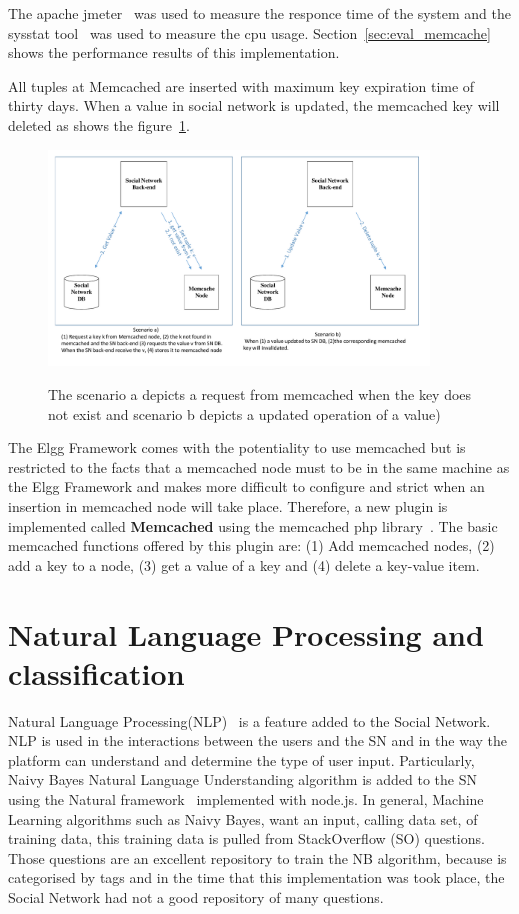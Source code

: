 The apache jmeter~\cite{jmeter_url} was used to measure the responce time of the system and the sysstat tool~\cite{sysstat_url} was used to measure the cpu usage. Section~\ref{sec:eval_memcache} 
 shows the performance results of this implementation.

All tuples at Memcached are inserted with maximum key expiration time of thirty days. When a value in social network is updated, the memcached key will deleted as shows the figure~\ref{fig:memcache_key_value}.

\begin{figure}[h]
	\caption{The scenario a depicts a request from memcached when the key does not exist and scenario b depicts a updated operation of a value) }
	\includegraphics[width=0.9\textwidth]{./fig/memcached_key_value.pdf}
	\centering
	\label{fig:memcache_key_value}
\end{figure}

The Elgg Framework comes with the potentiality to use memcached but is restricted to the facts that a memcached node must to be in the same machine as the Elgg Framework and makes more difficult to configure and strict when an insertion in memcached node will take place. Therefore, a new plugin is implemented called \textbf{Memcached} using the memcached php library~\cite{memcached_php_doc}. The basic memcached functions offered by this plugin are: (1) Add memcached nodes, (2) add a key to a node, (3) get a value of a key and (4) delete a key-value item. 

\section{Natural Language Processing and classification}
\label{sec:natural_implementation}
Natural Language Processing(NLP)~\cite{manning1999foundations} is a feature added to the Social Network. NLP is used in the interactions between the users and the SN and in the way the platform can understand and determine the type of user input. Particularly, Naivy Bayes Natural Language Understanding algorithm is added to the SN using the Natural framework~\cite{nodenatural_url} implemented with node.js. In general, Machine Learning algorithms such as Naivy Bayes, want an input, calling data set, of training data, this training data is pulled from StackOverflow (SO) questions. Those questions are an excellent repository to train the NB algorithm, because is categorised by tags and in the time that this implementation was took place, the Social Network had not a good repository of many questions.

